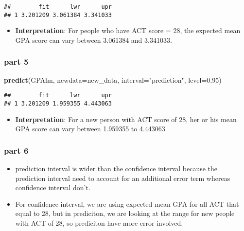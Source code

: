 \documentclass[]{article}
\newenvironment{Shaded}{\begin{snugshade}}{\end{snugshade}}
\newcommand{\DataTypeTok}[1]{\textcolor[rgb]{0.13,0.29,0.53}{#1}}
\newcommand{\FloatTok}[1]{\textcolor[rgb]{0.00,0.00,0.81}{#1}}
\newcommand{\KeywordTok}[1]{\textcolor[rgb]{0.13,0.29,0.53}{\textbf{#1}}}
\newcommand{\NormalTok}[1]{#1}
\newcommand{\StringTok}[1]{\textcolor[rgb]{0.31,0.60,0.02}{#1}}
\providecommand{\tightlist}{%
  \setlength{\itemsep}{0pt}\setlength{\parskip}{0pt}}
\begin{document}
\begin{verbatim}
##        fit      lwr      upr
## 1 3.201209 3.061384 3.341033
\end{verbatim}

\begin{itemize}
\tightlist
\item
  \textbf{Interpretation}: For people who have ACT score = 28, the
  expected mean GPA score can vary between 3.061384 and 3.341033.
\end{itemize}

\hypertarget{part-5}{%
\subsubsection{part 5}\label{part-5}}

\begin{Shaded}
\begin{Highlighting}[]
\KeywordTok{predict}\NormalTok{(GPAlm, }\DataTypeTok{newdata=}\NormalTok{new_data, }\DataTypeTok{interval=}\StringTok{"prediction"}\NormalTok{, }\DataTypeTok{level=}\FloatTok{0.95}\NormalTok{)}
\end{Highlighting}
\end{Shaded}

\begin{verbatim}
##        fit      lwr      upr
## 1 3.201209 1.959355 4.443063
\end{verbatim}

\begin{itemize}
\tightlist
\item
  \textbf{Interpretation}: For a new person with ACT score of 28, her or
  his mean GPA score can vary between 1.959355 to 4.443063
\end{itemize}

\hypertarget{part-6}{%
\subsubsection{part 6}\label{part-6}}

\begin{itemize}
\tightlist
\item
  prediction interval is wider than the confidence interval because the
  prediction interval need to account for an additional error term
  whereas confidence interval don't.
\item
  For confidence interval, we are using expected mean GPA for all ACT
  that equal to 28, but in prediciton, we are looking at the range for
  new people with ACT of 28, so prediciton have more error involved.
\end{itemize}
\end{document}
